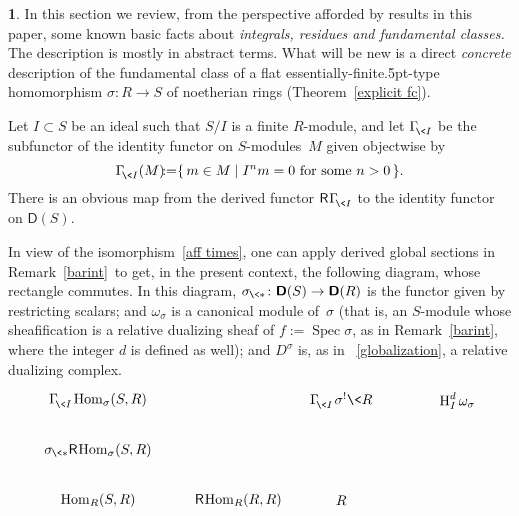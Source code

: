 \documentclass{compositio}
\theoremstyle{plain}
\theoremstyle{definition}
\newtheorem{cosa}[thm]{}
\theoremstyle{remark}
\numberwithin{equation}{thm}
\begin{document}
\begin{cosa}\label{intres}  
In this section we review, from the perspective afforded by results in this paper, some known basic facts about \emph{integrals, residues and fundamental classes.}  The description is mostly in abstract terms. What will be new is a direct \emph{concrete} description of the fundamental class of a flat 
essentially-finite{\kern.5pt}-type homomorphism $\sigma\colon R\to S$ of noetherian rings (Theorem~\ref{explicit fc}).{\vspace{2pt}}

Let $I\subset S$ be an ideal such that $S/I$ is a finite
$R$-module, and let $\Gamma^{}_{\!{\mkern-1mu}\<I}$  be the subfunctor of the identity functor on $S$-modules~$M$
given objectwise by
\[
\Gamma^{}_{\!{\mkern-1mu}\<I}(M){\!:=}\{\,m\in M\mid I^nm=0\textup{ for some }n>0\,\}.
\]
There is an obvious map from the derived functor ${\mathsf R}{\mkern1mu}\Gamma^{}_{\!{\mkern-1mu}\<I}$ to the identity functor on ${\boldsymbol{\mathsf{D}}}(S)$.

In view of  the isomorphism~\eqref{aff times}, one can apply derived global sections in \mbox{Remark~\ref{barint} }to get, in the present context, the following diagram, whose rectangle commutes. In this diagram, 
$\sigma_{{\mkern-1mu}\<*}\colon{\boldsymbol{\mathsf{D}}}(S)\to{\boldsymbol{\mathsf{D}}}(R)$ is the functor given by restricting scalars; and $\omega_\sigma$ is a 
canonical module of~$\sigma$ (that is, an $S$-module whose sheafification is a relative dualizing sheaf of $f{\!:=}\operatorname{Spec}\sigma$, as in Remark~\ref{barint}, where the integer $d$ is defined as well); and $D^\sigma$ is, as in ~\ref{globalization}, a relative dualizing complex.{\vspace{4pt}}
\[

\begin{tikzpicture}[xscale=4.7, yscale=2.5]

   \node(11) at (1,-1) {$\Gamma^{}_{\!{\mkern-1mu}\<I}{\mkern-1mu}\operatorname{Hom}_\sigma(S,R)$};     
   \node(12) at (2.3,-1){$\Gamma^{}_{\!{\mkern-1mu}\<I}{\mkern1mu}{\mkern1mu}\sigma^!\<R$};   
   \node(13) at (2.92,-1){$\textup{H}^d_I\,\omega_\sigma$};   

   \node(151) at (1,-1.5){$\sigma_{{\mkern-1mu}\<*}{\mathsf R}{\mkern-1mu}{\mkern-1mu}\operatorname{Hom}_\sigma(S,R)$}; 

   \node(21) at (1,-2){$\operatorname{Hom}_R(S,R)$};    
   \node(215) at (1.75,-2){${\mathsf R}{\mkern-1mu}{\mkern-1mu}\operatorname{Hom}_R(R,R)$};   
   \node(22) at (2.3,-2){$R$}; 


\end{tikzpicture}\]
\end{cosa}
\end{document}
